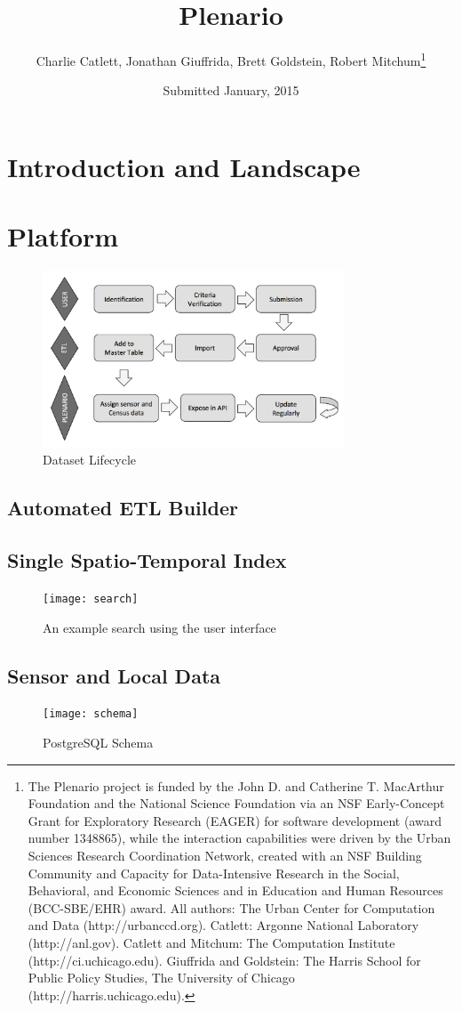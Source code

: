 \documentclass[11pt]{article}
\title{Plenario}
\author{Charlie Catlett, Jonathan Giuffrida, Brett Goldstein, Robert Mitchum\footnote{The Plenario project is funded by the John D. and Catherine T. MacArthur Foundation and the National Science Foundation via an NSF Early-Concept Grant for Exploratory Research (EAGER) for software development (award number 1348865), while the interaction capabilities were driven by the Urban Sciences Research Coordination Network, created with an NSF Building Community and Capacity for Data-Intensive Research in the Social, Behavioral, and Economic Sciences and in Education and Human Resources (BCC-SBE/EHR) award. \newline \newline All authors: The Urban Center for Computation and Data (http://urbanccd.org). Catlett: Argonne National Laboratory (http://anl.gov). Catlett and Mitchum: The Computation Institute (http://ci.uchicago.edu). Giuffrida and Goldstein: The Harris School for Public Policy Studies, The University of Chicago (http://harris.uchicago.edu).}}
\date{Submitted January, 2015}
\begin{document}
\maketitle 


\begin{abstract}

\end{abstract}

\section{Introduction and Landscape}

\section{Platform}
\begin{figure}[h]
	\caption{Dataset Lifecycle}
	\centering
	\includegraphics[width=0.8\textwidth]{flowchart}
\end{figure}

\subsection{Automated ETL Builder}

\subsection{Single Spatio-Temporal Index}

\begin{figure}[h]
	\caption{An example search using the user interface}
	\centering
	\texttt{[image: search]}
\end{figure}
\subsection{Sensor and Local Data}

\begin{figure}[h]
	\caption{PostgreSQL Schema}
	\centering
	\texttt{[image: schema]}
\end{figure}
\end{document}
